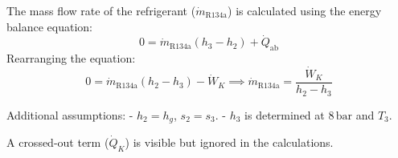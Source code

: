 The mass flow rate of the refrigerant (\( \dot{m}_{\text{R134a}} \)) is calculated using the energy balance equation:  
\[
0 = \dot{m}_{\text{R134a}} (h_3 - h_2) + \dot{Q}_{\text{ab}}
\]  
Rearranging the equation:  
\[
0 = \dot{m}_{\text{R134a}} (h_2 - h_3) - \dot{W}_K \implies \dot{m}_{\text{R134a}} = \frac{\dot{W}_K}{h_2 - h_3}
\]  

Additional assumptions:  
- \( h_2 = h_g \), \( s_2 = s_3 \).  
- \( h_3 \) is determined at \( 8 \, \text{bar} \) and \( T_3 \).  

A crossed-out term (\( \dot{Q}_K \)) is visible but ignored in the calculations.